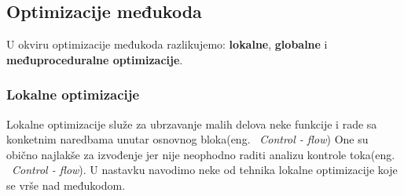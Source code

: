 \documentclass[a4paper]{article}
\begin{document}
\subsection{Optimizacije međukoda}
\label{subsec:optimizacija_međukod}
U okviru optimizacije međukoda razlikujemo: \textbf{lokalne}, \textbf{globalne} i \textbf{međuproceduralne optimizacije}.

\subsubsection{Lokalne optimizacije}
\label{subsubsec:lokalne}
Lokalne optimizacije služe za ubrzavanje malih delova neke funkcije i rade sa konketnim naredbama unutar osnovnog bloka(eng. ~{\em  Control - flow})
One su obično najlakše za izvođenje jer nije neophodno raditi analizu kontrole toka(eng. ~{\em  Control - flow}).  
U nastavku navodimo neke od tehnika lokalne optimizacije koje se vrše nad međukodom. 
\end{document}
